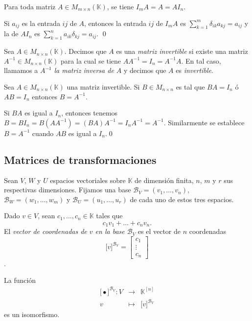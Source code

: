 \begin{prop}
Para toda matriz $A\in M_{m\times n}(\mathbb{K})$, se tiene $I_mA=A=AI_n$.
\end{prop}

\dem Si $a_{ij}$ es la entrada $ij$ de $A$, entonces la entrada $ij$ de $I_mA$ es $\sum_{k=1}^m \delta_{ik}a_{kj}=a_{ij}$ y la de $AI_n$ es $\sum_{k=1}^na_{ik}\delta_{kj}=a_{ij}$. \qed

\begin{defn}
Sea $A\in M_{n\times n}(\mathbb{K})$. Decimos que $A$ es una \emph{matriz invertible} si existe una matriz $A^{-1}\in M_{n\times n}(\mathbb{K})$ para la cual se tiene $AA^{-1}=I_n=A^{-1}A$. En tal caso, llamamos a $A^{-1}$ \emph{la matriz inversa de $A$} y decimos que $A$ es \emph{invertible}.
\end{defn}

\begin{prop}
Sea $A\in M_{n\times n}(\mathbb{K})$ una matriz invertible. Si $B\in M_{n\times n}$ es tal que $BA=I_n$ \'o $AB=I_n$ entonces $B=A^{-1}$.
\end{prop}

\dem Si $BA$ es igual a $I_n$, entonces tenemos $B=BI_n=B(AA^{-1})=(BA)A^{-1}=I_nA^{-1}=A^{-1}$. Similarmente se establece $B=A^{-1}$ cuando $AB$ es igual a $I_n$.\qed

\subsection*{Matrices de transformaciones}

Sean $V$, $W$ y $U$ espacios vectoriales sobre $\mathbb{K}$ de dimensi\'on finita, $n$, $m$ y $r$ sus respectivas dimensiones. Fijamos una base $\mathcal{B}_V=(v_1,\ldots,v_n)$, $\mathcal{B}_W=(w_1,\ldots,w_m)$ y $\mathcal{B}_U=(u_1,\ldots,u_r)$ de cada uno de estos tres espacios.

\begin{defn}
Dado $v\in V$, sean $c_1,\ldots,c_n\in \mathbb{K}$ tales que
$$c_1v_1+\ldots+c_nv_n.$$
El \emph{vector de coordenadas de $v$ en la base $\mathcal{B}_V$} es el vector de $n$ coordenadas 
$$\Big[ v \Big]^{\mathcal{B}_V}=\left[\begin{array}{c}
  c_{1}\\
  \vdots\\
  c_{n}
  \end{array}\right]$$.
\end{defn}

\begin{prop}
La funci\'on
\begin{eqnarray*}
\Big[ \bullet \Big]^{\mathcal{B}_V}: V & \longrightarrow & \mathbb{K}^{[n]}\\
v & \longmapsto & \Big[ v \Big]^{\mathcal{B}_V}
\end{eqnarray*}
es un isomorfismo.
\end{prop}

